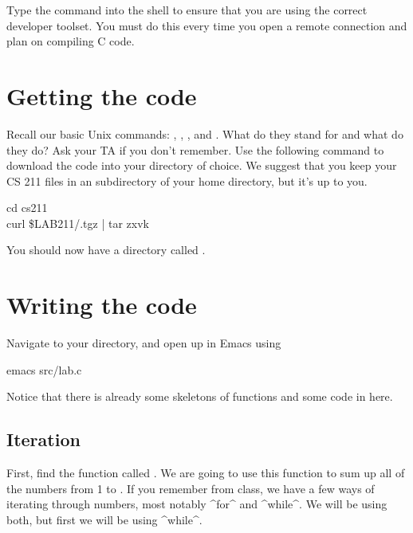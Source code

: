 \documentclass{tufte-handout}
\begin{document}
Type the  command into the shell to ensure that you are
using the correct developer toolset. You must do this every time you
open a remote connection and plan on compiling C code.

\section{Getting the code}

Recall our basic Unix commands: , , , and . What do they stand for and what do they do? Ask your TA if you don't remember. Use the following  command to download the code into your directory of choice. We suggest that you keep your CS 211 files in an  subdirectory of your home directory, but it's up to you.

\begin{CmdLine*}
  \C cd cs211\\
  \C curl \$LAB211/\ThisLabBase.tgz | tar zxvk\\
\end{CmdLine*}

You should now have a directory called \filename{\ThisLabBase}.

\section{Writing the code}
Navigate to your \filename{\LabBaseUrl} directory, and open up
 in Emacs using 
\begin{CmdLine*}
  \C emacs src/lab.c\\
\end{CmdLine*}
Notice that there is already some skeletons of functions and some code in  here.

\subsection{Iteration}

First, find the function called
. We are going to use this function to sum up all of the numbers
from 1 to .  If you remember from class, we have a few ways
of iterating through numbers, most notably ^for^ and ^while^.  We will
be using both, but first we will be using ^while^.
\end{document}
